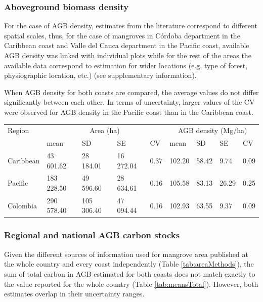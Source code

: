 \documentclass[review, authoryear]{elsarticle}   	%
\begin{document}
\subsubsection{Aboveground biomass density}
For the case of AGB density, estimates from the literature correspond to different spatial scales, thus, for the case of mangroves in C\'ordoba department in the Caribbean coast and Valle del Cauca department in the Pacific coast, available AGB density was linked with individual plots while for the rest of the areas the available data correspond to estimation for wider locations (e.g. type of forest, physiographic location, etc.) (see supplementary information). 

When AGB density for both coasts are compared, the average values do not differ significantly between each other. In terms of uncertainty, larger values of the CV were observed for AGB density in the Pacific coast than in the Caribbean coast. 

\begin{table}[htbp]
   \centering
   \begin{tabular}{p{1.5cm}p{1.8cm}p{1.8cm}p{1.8cm}p{1.0cm}p{1.0cm}p{1.0cm}p{1.0cm}p{1.0cm}} %
      \toprule
      
       Region & \multicolumn{4}{c}{Area (ha)} & \multicolumn{4}{c}{AGB density (Mg/ha)}\\
      &mean&SD&SE&CV&mean&SD&SE&CV\\
            \midrule
      Caribbean&43 601.62&28 184.01&16 272.04&0.37&102.20&58.42&9.74&0.09\\
      Pacific&183 228.50&49 596.60&28 634.61&0.16&105.58&83.13&26.29&0.25\\
      Colombia&290 578.40&105 306.40 &47 094.44&0.16&102.93&63.55&9.37&0.09\\
            \bottomrule
   \end{tabular}
   \label{tab:means}
\end{table}


\subsubsection{Regional and national AGB carbon stocks}
Given the different sources of information used for mangrove area published at the whole country and every coast independently (Table \ref{tab:areaMethods}), the sum of total carbon in AGB estimated for both coasts does not match exactly to the value reported for the whole country (Table \ref{tab:meansTotal}). However, both estimates overlap in their uncertainty ranges. 
\end{document}
